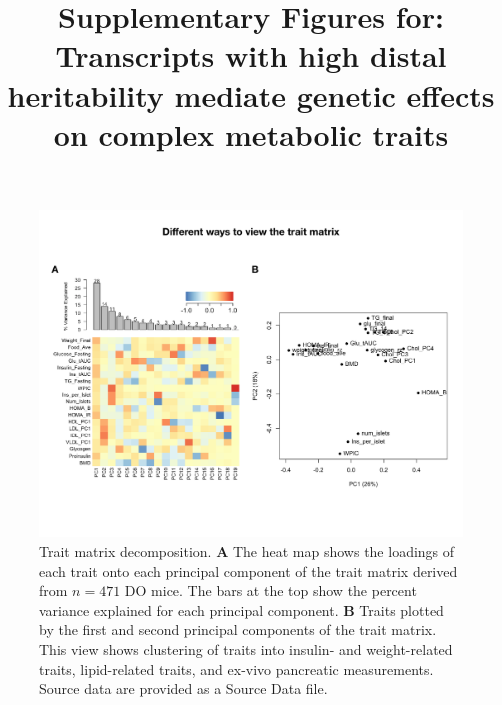 \documentclass[
]{article}
\title{Supplementary Figures for: Transcripts with high distal
heritability mediate genetic effects on complex metabolic traits}
\author{}
\date{\vspace{-2.5em}}
\newcommand{\beginsupplement}{
	\renewcommand{\figurename}{Supplementary Figure}
	\setcounter{figure}{0}
}
\begin{document}
\maketitle

\beginsupplement

\begin{figure}[ht!]
\includegraphics[width=\textwidth]{Figures/Supp_Fig_Trait_Decomposition.pdf} 
\caption{Trait matrix decomposition. \textbf{A} The heat map 
shows the loadings of each trait onto each principal component 
of the trait matrix derived from $n = 471$ DO mice. The bars 
at the top show the percent variance explained for each principal 
component. \textbf{B} Traits plotted by the first and second 
principal components of the trait matrix. This view shows 
clustering of traits into insulin- and weight-related traits, 
lipid-related traits, and ex-vivo pancreatic measurements. 
Source data are provided as a Source Data file.
}
\label{fig:trait_decomp}
\end{figure}
\end{document}
